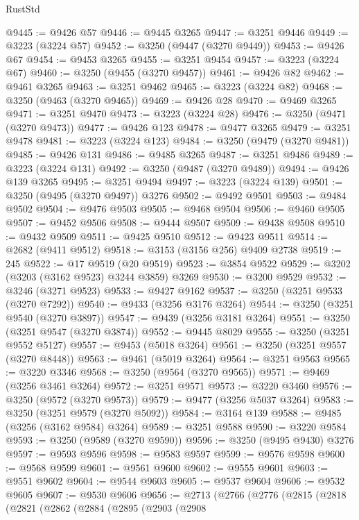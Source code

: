 \begin{lexlean}{RustStd}
\begin{coremodule}
@9445 := @9426 @57
@9446 := @9445 @3265
@9447 := @3251 @9446
@9449 := @3223 (@3224 @57)
@9452 := @3250 (@9447 (@3270 @9449))
@9453 := @9426 @67
@9454 := @9453 @3265
@9455 := @3251 @9454
@9457 := @3223 (@3224 @67)
@9460 := @3250 (@9455 (@3270 @9457))
@9461 := @9426 @82
@9462 := @9461 @3265
@9463 := @3251 @9462
@9465 := @3223 (@3224 @82)
@9468 := @3250 (@9463 (@3270 @9465))
@9469 := @9426 @28
@9470 := @9469 @3265
@9471 := @3251 @9470
@9473 := @3223 (@3224 @28)
@9476 := @3250 (@9471 (@3270 @9473))
@9477 := @9426 @123
@9478 := @9477 @3265
@9479 := @3251 @9478
@9481 := @3223 (@3224 @123)
@9484 := @3250 (@9479 (@3270 @9481))
@9485 := @9426 @131
@9486 := @9485 @3265
@9487 := @3251 @9486
@9489 := @3223 (@3224 @131)
@9492 := @3250 (@9487 (@3270 @9489))
@9494 := @9426 @139 @3265
@9495 := @3251 @9494
@9497 := @3223 (@3224 @139)
@9501 := @3250 (@9495 (@3270 @9497)) @3276
@9502 := @9492 @9501
@9503 := @9484 @9502
@9504 := @9476 @9503
@9505 := @9468 @9504
@9506 := @9460 @9505
@9507 := @9452 @9506
@9508 := @9444 @9507
@9509 := @9438 @9508
@9510 := @9432 @9509
@9511 := @9425 @9510
@9512 := @9423 @9511
@9514 := @2682 (@9411 @9512)
@9518 := @3153 (@3156 @256) @9409 @2738
@9519 := 245
@9522 := @17 @9519 (@20 @9519)
@9523 := @3854 @9522
@9529 := @3202 (@3203 (@3162 @9523) @3244 @3859) @3269
@9530 := @3200 @9529
@9532 := @3246 (@3271 @9523)
@9533 := @9427 @9162
@9537 := @3250 (@3251 @9533 (@3270 @7292))
@9540 := @9433 (@3256 @3176 @3264)
@9544 := @3250 (@3251 @9540 (@3270 @3897))
@9547 := @9439 (@3256 @3181 @3264)
@9551 := @3250 (@3251 @9547 (@3270 @3874))
@9552 := @9445 @8029
@9555 := @3250 (@3251 @9552 @5127)
@9557 := @9453 (@5018 @3264)
@9561 := @3250 (@3251 @9557 (@3270 @8448))
@9563 := @9461 (@5019 @3264)
@9564 := @3251 @9563
@9565 := @3220 @3346
@9568 := @3250 (@9564 (@3270 @9565))
@9571 := @9469 (@3256 @3461 @3264)
@9572 := @3251 @9571
@9573 := @3220 @3460
@9576 := @3250 (@9572 (@3270 @9573))
@9579 := @9477 (@3256 @5037 @3264)
@9583 := @3250 (@3251 @9579 (@3270 @5092))
@9584 := @3164 @139
@9588 := @9485 (@3256 (@3162 @9584) @3264)
@9589 := @3251 @9588
@9590 := @3220 @9584
@9593 := @3250 (@9589 (@3270 @9590))
@9596 := @3250 (@9495 @9430) @3276
@9597 := @9593 @9596
@9598 := @9583 @9597
@9599 := @9576 @9598
@9600 := @9568 @9599
@9601 := @9561 @9600
@9602 := @9555 @9601
@9603 := @9551 @9602
@9604 := @9544 @9603
@9605 := @9537 @9604
@9606 := @9532 @9605
@9607 := @9530 @9606
@9656 := @2713
    (@2766
      (@2776
        (@2815
          (@2818
            (@2821
              (@2862
                (@2884
                  (@2895
                    (@2903
                      (@2908

\end{coremodule}
\end{lexlean}
